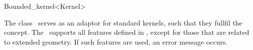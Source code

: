 
\ccAutoIndexingOff
\begin{ccRefClass}{Bounded_kernel<Kernel>}
\ccAutoIndexingOn
{}

\ccDefinition
  
The class \ccRefName\ serves as an adaptor for standard kernels, such
that they fullfil the 
concept. The \ccRefName\ supports all features defined
in , except for those that are related to
extended geometry. If such features are used, an error message occurs.


\ccIsModel

%
 \\

\ccCreation
{}  %


\ccSeeAlso

 \\
 \\


\ccIndexTraitsClassEnd
\ccAutoIndexingOff
\end{ccRefClass}
\ccAutoIndexingOn

